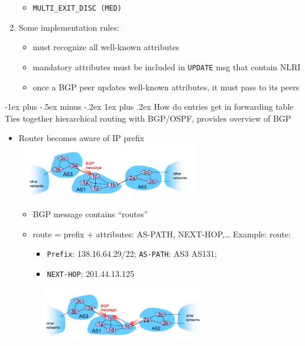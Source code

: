 \documentclass[10pt,landscape]{article}
\makeatletter
\newcommand{\subsubsubsection}{\@startsection{subsubsection}{3}{0mm}%
                                {-1ex plus -.5ex minus -.2ex}%
                                {1ex plus .2ex}%
                                {\normalfont\scriptsize\bfseries}}
\makeatother
\begin{document}
\begin{multicols*}{3}
\begin{enumerate}[topsep=0pt,noitemsep,wide=0pt, leftmargin=\dimexpr\labelwidth + 2\labelsep\relax]
\begin{itemize}[topsep=0pt,noitemsep,wide=0pt, leftmargin=\dimexpr{} + 2\relax]
    \item \verb|MULTI_EXIT_DISC (MED)|
  \end{itemize}
  \item Some implementation rules:
  \begin{itemize}[topsep=0pt,noitemsep,wide=0pt, leftmargin=\dimexpr{} + 2\relax]
    \item must recognize all well-known attributes
    \item mandatory attributes must be included in \verb|UPDATE| msg that contain NLRI
    \item once a BGP peer updates well-known attributes, it must pass to its peers
  \end{itemize}
\end{enumerate}

\subsubsubsection{How do entries get in forwarding table}
Ties together hierarchical routing with BGP/OSPF, provides overview of BGP
\begin{itemize}[topsep=0pt,noitemsep,wide=0pt, leftmargin=\dimexpr{} + 2\relax]
  \item Router becomes aware of IP prefix
  \includegraphics*[width=8.2cm, height=2.4cm]{images/prefix1.png}
  \begin{itemize}[topsep=0pt,noitemsep,wide=0pt, leftmargin=\dimexpr{} + 2\relax]
    \item BGP message contains “routes”
    \item route = prefix + attributes: AS-PATH, NEXT-HOP,… Example: route:
    \begin{itemize}[topsep=0pt,noitemsep,wide=0pt, leftmargin=\dimexpr{} + 2\relax]
      \item \verb|Prefix|: 138.16.64.29/22; \verb|AS-PATH|: AS3 AS131;
      \item \verb|NEXT-HOP|: 201.44.13.125
    \end{itemize}
    \includegraphics*[width=8.2cm, height=2.4cm]{images/prefix2.png}

\end{itemize}
\end{itemize}
\end{multicols*}
\end{document}
